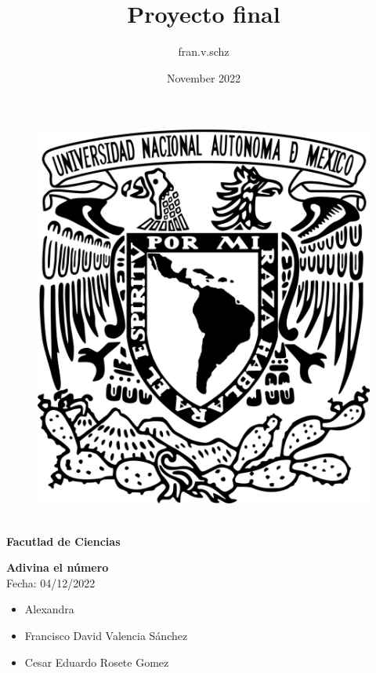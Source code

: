 \documentclass[12pt]{article}
\title{Proyecto final}
\author{fran.v.schz }
\date{November 2022}
\begin{document}
\begin{figure}[h]
    \centering
    \includegraphics[scale=.30]{Unam.png}
\end{figure}

{\centering 
{{}}\\
\vspace{1cm}
{\Huge{\textbf{Facutlad de Ciencias}}}\\
\vspace{1cm}
\hline
\vspace{2cm} 

{\centering
{\Huge{\textbf{Adivina el número}}}\\
\vspace{1cm}
\Large{Fecha: 04/12/2022}}


\vspace{2cm}

\Large{
\begin{itemize}
    \item Alexandra 
    \item Francisco David Valencia Sánchez
    \item Cesar Eduardo Rosete Gomez
\end{itemize}}
}
\end{document}

